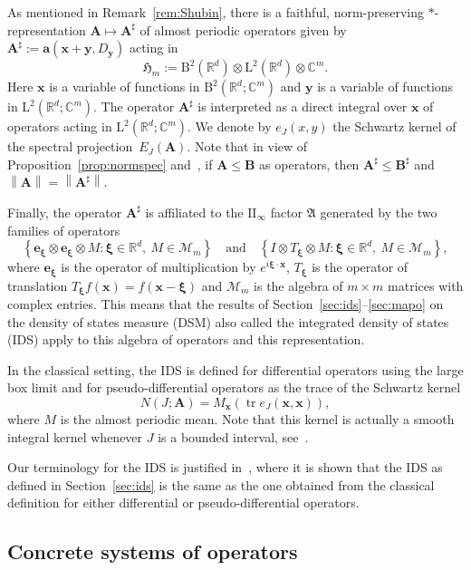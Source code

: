 \documentclass[10pt]{amsart}
\theoremstyle{definition}\newtheorem{defi}[theo]{Definition}\newtheorem{rema}[theo]{Remark}\newtheorem{exam}[theo]{Example}\newtheorem{nota}[theo]{Notation}
\newcommand{\RB}{\mathrm{B}}
\newcommand{\RL}{\mathrm{L}}
\newcommand{\rmII}{\mathrm{II}}
\newcommand{\R}{\mathbb R}
\newcommand{\C}{\mathbb C}
\newcommand{\CM}{\mathcal{M}}
\newcommand{\bxi}{\boldsymbol \xi}
\newcommand{\ba}{\mathbf a}
\newcommand{\BA}{\mathbf A}
\newcommand{\BB}{\mathbf B}
\newcommand{\bx}{\mathbf x}
\newcommand{\be}{\mathbf e}
\newcommand{\by}{\mathbf y}
\newcommand{\FA}{\mathfrak A}
\newcommand{\FH}{\mathfrak H}
\newcommand{\set}[1]{\left\{ #1 \right\}}
\newcommand{\norm}[1]{\left\| #1 \right\|}
\begin{document}
As mentioned in Remark~\ref{rem:Shubin}, there is a faithful, norm-preserving $*$-representation $\BA \mapsto \BA^\sharp$ of almost periodic operators given by $\BA^\sharp := \ba(\bx + \by,D_\by)$
acting in
\[
\FH_m := \RB^2\left(\R^d\right) \otimes \RL^2\left(\R^d\right) \otimes \C^m.
\]
Here $\bx$ is a variable of functions in $\RB^2(\R^d;\C^m)$ and $\by$ is a variable of functions in $\RL^2(\R^d;\C^m)$. The operator $\BA^\sharp$ is interpreted as a direct integral over $\bx$ of operators acting in $\RL^2(\R^d;\C^m)$. We denote by $e_J(x,y)$ the Schwartz kernel of the spectral projection~$E_J(\BA)$. Note that in view of Proposition~\ref{prop:normspec} and~\cite{CoburnMoyerSinger}, if $\BA \le \BB$ as operators, then $\BA^\sharp \le \BB^\sharp$ and $\norm \BA = \norm{\BA^\sharp}$.

Finally, the operator $\BA^\sharp$ is affiliated to the $\rmII_\infty$ factor $\FA$ generated by the two families of operators
\[
\set{\be_{\bxi} \otimes \be_{\bxi}\otimes M: \bxi \in \R^d,\ M\in \CM_m} \quad \text{and} \quad \set{I \otimes T_{\bxi}\otimes M: \bxi \in \R^d,\ M\in \CM_m},
\]
where $\be_{\bxi}$ is the operator of multiplication by $e^{i \bxi \cdot \bx}$, $T_{{\bxi}}$ is the operator of translation $T_{\bxi} f(\bx) = f(\bx - \bxi)$ and $\CM_m$ is the algebra of $m\times m$ matrices with complex entries. This means that the results of Section~\ref{sec:ids}--\ref{sec:mapo} on the density of states measure (DSM) also called the integrated density of states (IDS) apply to this algebra of operators and this representation.

In the classical setting, the IDS is defined for differential operators using the large box limit and for pseudo-differential operators as the trace of the Schwartz kernel
\begin{equation}
N(J;\BA) = M_\bx(\operatorname{tr} e_J(\bx,\bx)),
\end{equation}
where $M$ is the almost periodic mean. Note that this kernel is actually a smooth integral kernel whenever $J$ is a bounded interval, see~\cite{ParSht2016}.

Our terminology for the IDS is justified in~\cite[Remark~3.1]{Shubin1979}, where it is shown that the IDS as defined in Section~\ref{sec:ids} is the same as the one obtained from the classical definition for either differential or pseudo-differential operators.

\subsection{Concrete systems of operators}
\end{document}
